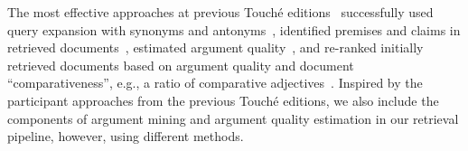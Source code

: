 The most effective approaches at previous Touch{\'e} editions~\cite{BondarenkoFBGAPBSWPH2020,BondarenkoGFBAPBSWPH2021} successfully used query expansion with synonyms and antonyms~\cite{AbyeST2020}, identified premises and claims in retrieved documents~\cite{Huck2020, ShirshakovaW2021}, estimated argument quality~\cite{AbyeST2020}, and re-ranked initially retrieved documents based on argument quality and document ``comparativeness'', e.g., a ratio of comparative adjectives~\cite{ChekalinaP2021}. Inspired by the participant approaches from the previous Touch{\'e} editions, we also include the components of argument mining and argument quality estimation in our retrieval pipeline, however, using different methods.
%
